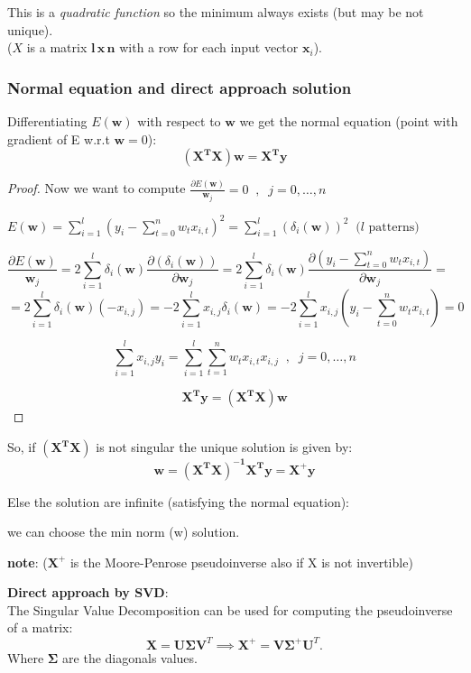 \documentclass[../main.tex]{subfiles}
\begin{document}
This is a \emph{quadratic function} so the minimum always exists (but may be not unique).\\
($X$ is a matrix $\mathbf{l\, x\, n}$ with a row for each input vector $\mathbf{x}_i$).

\subsubsection{Normal equation and direct approach solution}
Differentiating $E(\mathbf{w})$ with respect to $\mathbf{w}$ we get the normal equation (point with gradient of E w.r.t $\mathbf{w} =0$):
$$ \mathbf{(X^TX)w = X^Ty}$$

\begin{proof} Now we want to compute $\frac{\partial E(\mathbf{w})}{\mathbf{w}_j} = 0 \;\; , \;\; j = 0, \dots, n$

$E(\mathbf{w}) = \sum_{i = 1}^{l}(y_i - \sum_{t = 0}^{n} w_t x_{i,t} )^2 =  \sum_{i = 1}^{l} (\delta_i(\mathbf{w}))^2 \;\;   \text{($l$ patterns)}$

$$\frac{\partial E(\mathbf{w})}{\mathbf{w}_j} = 2\sum_{i = 1}^{l} \delta_i(\mathbf{w}) \frac{\partial (\delta_i(\mathbf{w}))}{\partial \mathbf{w}_j} =   2\sum_{i = 1}^{l} \delta_i(\mathbf{w}) \frac{\partial (y_i - \sum_{t = 0}^{n} w_t x_{i,t} )}{\partial \mathbf{w}_j}=\quad  \quad$$
$$=2\sum_{i = 1}^{l} \delta_i(\mathbf{w}) (-x_{i,j}) = -2\sum_{i = 1}^{l} x_{i,j} \delta_i(\mathbf{w}) =
-2\sum_{i = 1}^{l} x_{i,j}(y_i - \sum_{t = 0}^{n} w_t x_{i,t} )  = 0
$$

$$\sum_{i = 1}^{l}x_{i,j}y_i = \sum_{i = 1}^{l}\sum_{t = 1}^{n} w_t x_{i,t} x_{i,j}  \;\; , \;\; j = 0, \dots, n$$

$$ \mathbf{X^Ty = (X^TX)w}$$
\end{proof}

So, if $ \mathbf{(X^TX)}$ is not singular the unique solution is given by:
$$ \mathbf{w = (X^TX)^{-1}X^Ty = X^+y} $$ 

Else the solution are infinite (satisfying the normal equation):
\begin{center}
    we can choose the min norm (w) solution.
\end{center}

\noindent\textbf{note}: ($\mathbf{X}^+$ is the Moore-Penrose pseudoinverse also if X is not invertible)

\noindent \textbf{Direct approach by SVD}:\\
The Singular Value Decomposition can be used for computing the pseudoinverse of a matrix:
\[
    \boldsymbol{X} = \boldsymbol{U}\boldsymbol{\Sigma}\boldsymbol{V}^T \implies  \boldsymbol{X}^+ = \boldsymbol{V}\boldsymbol{\Sigma}^+\boldsymbol{U}^T
.\] 
Where $\boldsymbol{\Sigma}$ are the diagonals values.
\end{document}
